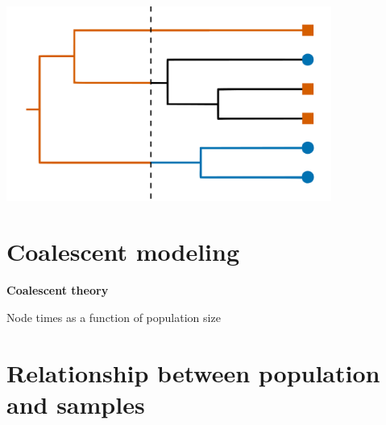 \documentclass[aspectratio=169]{beamer}
\begin{document}
\begin{frame} \frametitle{\insertsection}

    \begin{center}

        \centering\includegraphics[width=0.8\textwidth]{images/tree-option3}

    \end{center}

\end{frame}


\section{Coalescent modeling}

\begin{frame} 
    \begin{center}
        \begin{huge}
    
            \textbf{Coalescent theory}

            Node times as a function of population size

        \end{huge}
    \end{center}
\end{frame}

\section{Relationship between population and samples}
\end{document}
